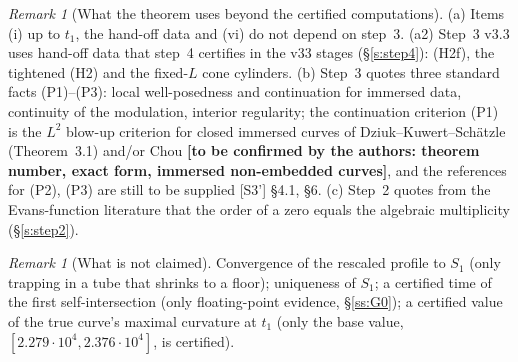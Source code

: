 \documentclass[11pt]{amsart}
\theoremstyle{definition}
\theoremstyle{remark}
\newtheorem{remark}[theorem]{Remark}
\newcommand{\dref}[1]{[\textsf{#1}]}
\begin{document}
\begin{remark}[What the theorem uses beyond the certified computations]\label{rem:uses}
(a) Items (i) up to $t_1$, the hand-off data and (vi) do not depend on step~3. (a2) Step~3 v3.3 uses hand-off data that step~4 certifies in the v33 stages (\S\ref{s:step4}): (H2f), the tightened (H2) and the fixed-$L$ cone cylinders. (b) Step~3 quotes three standard facts (P1)--(P3): local well-posedness and continuation for immersed data, continuity of the modulation, interior regularity; the continuation criterion (P1) is the $L^2$ blow-up criterion for closed immersed curves of Dziuk--Kuwert--Sch\"atzle \cite{DziukKuwertSchatzle2002} (Theorem~3.1) and/or Chou \cite{Chou2003} \textbf{[to be confirmed by the authors: theorem number, exact form, immersed non-embedded curves]}, and the references for (P2), (P3) are still to be supplied \dref{S3'} \S4.1, \S6. (c) Step~2 quotes from the Evans-function literature that the order of a zero equals the algebraic multiplicity \cite{AlexanderGardnerJones1990,KapitulaPromislow2013,LatushkinSukhtayev2010} (\S\ref{s:step2}).
\end{remark}

\begin{remark}[What is not claimed]
Convergence of the rescaled profile to $S_1$ (only trapping in a tube that shrinks to a floor); uniqueness of $S_1$; a certified time of the first self-intersection (only floating-point evidence, \S\ref{ss:G0}); a certified value of the true curve's maximal curvature at $t_1$ (only the base value, $[2.279\cdot10^4,2.376\cdot10^4]$, is certified).
\end{remark}
\end{document}
